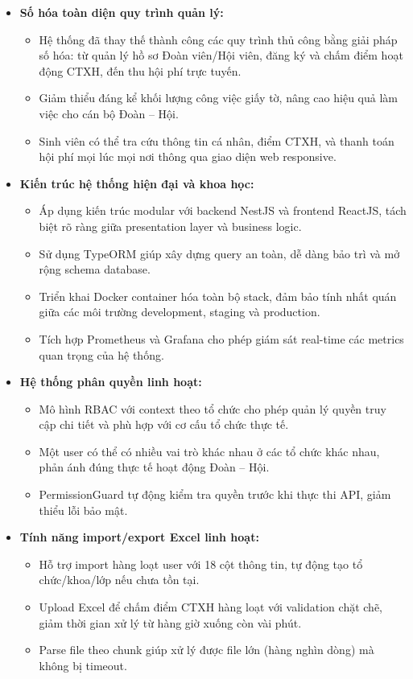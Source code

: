 \begin{itemize}
    \item \textbf{Số hóa toàn diện quy trình quản lý:}
    \begin{itemize}
        \item Hệ thống đã thay thế thành công các quy trình thủ công bằng giải pháp số hóa: từ quản lý hồ sơ Đoàn viên/Hội viên, đăng ký và chấm điểm hoạt động CTXH, đến thu hội phí trực tuyến.
        \item Giảm thiểu đáng kể khối lượng công việc giấy tờ, nâng cao hiệu quả làm việc cho cán bộ Đoàn -- Hội.
        \item Sinh viên có thể tra cứu thông tin cá nhân, điểm CTXH, và thanh toán hội phí mọi lúc mọi nơi thông qua giao diện web responsive.
    \end{itemize}
    
    \item \textbf{Kiến trúc hệ thống hiện đại và khoa học:}
    \begin{itemize}
        \item Áp dụng kiến trúc modular với backend NestJS và frontend ReactJS, tách biệt rõ ràng giữa presentation layer và business logic.
        \item Sử dụng TypeORM giúp xây dựng query an toàn, dễ dàng bảo trì và mở rộng schema database.
        \item Triển khai Docker container hóa toàn bộ stack, đảm bảo tính nhất quán giữa các môi trường development, staging và production.
        \item Tích hợp Prometheus và Grafana cho phép giám sát real-time các metrics quan trọng của hệ thống.
    \end{itemize}
    
    \item \textbf{Hệ thống phân quyền linh hoạt:}
    \begin{itemize}
        \item Mô hình RBAC với context theo tổ chức cho phép quản lý quyền truy cập chi tiết và phù hợp với cơ cấu tổ chức thực tế.
        \item Một user có thể có nhiều vai trò khác nhau ở các tổ chức khác nhau, phản ánh đúng thực tế hoạt động Đoàn -- Hội.
        \item PermissionGuard tự động kiểm tra quyền trước khi thực thi API, giảm thiểu lỗi bảo mật.
    \end{itemize}
    
    \item \textbf{Tính năng import/export Excel linh hoạt:}
    \begin{itemize}
        \item Hỗ trợ import hàng loạt user với 18 cột thông tin, tự động tạo tổ chức/khoa/lớp nếu chưa tồn tại.
        \item Upload Excel để chấm điểm CTXH hàng loạt với validation chặt chẽ, giảm thời gian xử lý từ hàng giờ xuống còn vài phút.
        \item Parse file theo chunk giúp xử lý được file lớn (hàng nghìn dòng) mà không bị timeout.
    \end{itemize}
    

\end{itemize}
